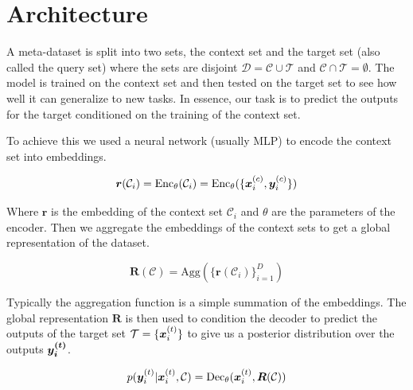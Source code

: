 \documentclass[../../main.tex]{subfiles}
\begin{document}

\section{Architecture}

A meta-dataset is split into two sets, the context set and the target set (also called the query set) where the sets are disjoint $\mathcal{D} = \mathcal{C} \cup \mathcal{T}$ and $\mathcal{C} \cap \mathcal{T} = \emptyset$. The model is trained on the context set and then tested on the target set to see how well it can generalize to new tasks. In essence, our task is to predict the outputs for the target conditioned on the training of the context set.

To achieve this we used a neural network (usually MLP) to encode the context set into embeddings. 

\begin{equation}
    \bm{r}(\mathcal{C}_i) = \text{Enc}_\theta(\mathcal{C}_i) = \text{Enc}_\theta(\{ \bm{x}_{i}^{(c)}, \bm{y}_i^{(c)} \})
\end{equation}

Where $\bm{r}$ is the embedding of the context set $\mathcal{C}_i$ and $\theta$ are the parameters of the encoder. Then we aggregate the embeddings of the context sets to get a global representation of the dataset. 

\begin{equation}
    \bm{R}(\mathcal{C}) = \text{Agg}(\{ \bm{r}(\mathcal{C}_i) \}_{i=1}^D)
\end{equation}

Typically the aggregation function is a simple summation of the embeddings. The global representation $\bm{R}$ is then used to condition the decoder to predict the outputs of the target set $\mathcal{T} = \{ \bm{x}_{i}^{(t)} \}$ to give us a posterior distribution over the outputs $\bm{y_i^{(t)}}$.

\begin{equation}
    p(\bm{y}_i^{(t)} | \bm{x}_i^{(t)}, \mathcal{C}) = \text{Dec}_\theta(\bm{x}_i^{(t)}, \bm{R}(\mathcal{C}))
\end{equation}
\end{document}
